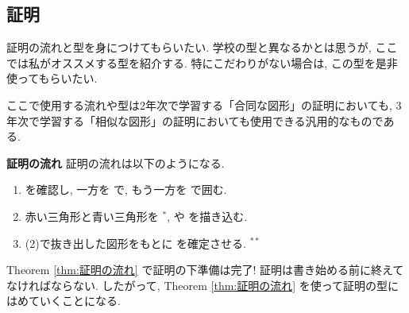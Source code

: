 \subsection{証明}

証明の流れと型を身につけてもらいたい. 学校の型と異なるかとは思うが, ここでは私がオススメする型を紹介する.
特にこだわりがない場合は, この型を是非使ってもらいたい.

ここで使用する流れや型は2年次で学習する「合同な図形」の証明においても, 3年次で学習する「相似な図形」の証明においても使用できる汎用的なものである.

\begin{theorembox}{\textbf{証明の流れ}}
    \label{thm:証明の流れ}
    証明の流れは以下のようになる.

    \begin{enumerate}
        \item \fitblankbf[証明したい図形]{} を確認し, 一方を \fitblankbf[赤い三角形]{} で, もう一方を \fitblankbf[青い三角形]{} で囲む.
        \item 赤い三角形と青い三角形を \fitblankbf[抜き出し]{} $^{*}$, \fitblankbf[仮定]{} や \fitblankbf[条件]{} を描き込む.
        \item (2)で抜き出した図形をもとに \fitblankbf[合同条件]{} を確定させる. $^{**}$
    \end{enumerate}
\end{theorembox}

Theorem \ref{thm:証明の流れ} で証明の下準備は完了! 証明は書き始める前に終えてなければならない.
したがって, Theorem \ref{thm:証明の流れ} を使って証明の型にはめていくことになる.

